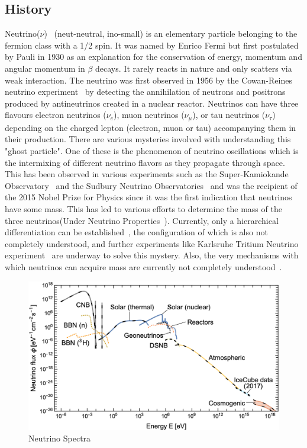 \subsection{History}
Neutrino($\nu$)~\cite{10.1063/1.2995181} (neut-neutral, ino-small) is an elementary particle belonging to the fermion class with a 1/2 spin. It was named by Enrico Fermi but first postulated by Pauli in 1930 as an explanation for the conservation of energy, momentum and angular momentum in $\beta$ decays. It rarely reacts in nature and only scatters via weak interaction. The neutrino was first observed in 1956 by the Cowan-Reines neutrino experiment~\cite{PhysRev.92.830} by detecting the annihilation of neutrons and positrons produced by antineutrinos created in a nuclear reactor. Neutrinos can have three flavours electron neutrinos ($\nu_e$), muon neutrinos ($\nu_{\mu}$), or tau neutrinos ($\nu_{\tau}$) depending on the charged lepton (electron, muon or tau) accompanying them in their production. There are various mysteries involved with understanding this "ghost particle". One of these is the phenomenon of neutrino oscillations which is the intermixing of different neutrino flavors as they propagate through space. This has been observed in various experiments such as the Super-Kamiokande Observatory~\cite{Fukuda_1998} and the Sudbury Neutrino Observatories~\cite{BELLERIVE201630} and was the recipient of the 2015 Nobel Prize for Physics since it was the first indication that neutrinos have some mass. This has led to various efforts to determine the mass of the three neutrinos(Under Neutrino Properties~\cite{ParticleDataGroup:2024cfk}). Currently, only a hierarchical differentiation can be established~\cite{Qian_2015}, the configuration of which is also not completely understood, and further experiments like Karlsruhe Tritium Neutrino experiment~\cite{aker2024directneutrinomassmeasurementbased} are underway to solve this mystery. Also, the very mechanisms with which neutrinos can acquire mass are currently not completely understood~\cite{CERN_courier_nu_mass}. 
\begin{figure}[t!]
  \centering
  \includegraphics[width=14.5cm]{thesis_figures/CRnNu/Neutrino spectra.jpg}
  \caption{Neutrino Spectra~\cite{SajjadAthar:2021prg}}
  \label{fig:Neutrino-spectra}
\end{figure}

